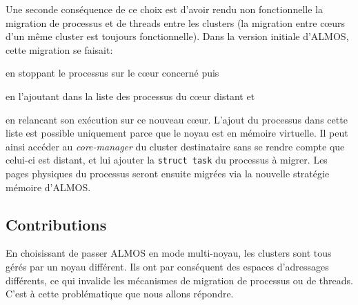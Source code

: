       Une seconde conséquence de ce choix est d'avoir rendu non fonctionnelle la
      migration de processus et de threads entre les clusters (la migration
      entre c\oe urs d'un même cluster est toujours fonctionnelle). Dans la
      version initiale d'ALMOS, cette migration se faisait:\benumline \item en
      stoppant le processus sur le c\oe ur concerné puis \item en l'ajoutant
      dans la liste des processus du c\oe ur distant et \item en relancant son
      exécution sur ce nouveau c\oe ur\eenumline. L'ajout du processus dans
      cette liste est possible uniquement parce que le noyau est en mémoire
      virtuelle. Il peut ainsi accéder au \textit{core-manager} du cluster
      destinataire sans se rendre compte que celui-ci est distant, et lui
      ajouter la \texttt{struct task} du processus à migrer. Les pages physiques
      du processus seront ensuite migrées via la nouvelle stratégie mémoire
      d'ALMOS.

    \subsection{Contributions}

      En choisissant de passer ALMOS en mode multi-noyau, les clusters sont tous
      gérés par un noyau différent. Ils ont par conséquent des espaces
      d'adressages différents, ce qui invalide les mécanismes de migration de
      processus ou de threads. C'est à cette problématique que nous allons
      répondre.


